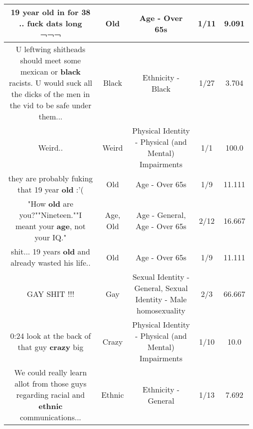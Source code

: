 \documentclass[11pt]{article}
\newlength\mylength
\begin{document}
\begin{center}
\begin{longtable}{|C{.65\mylength}|C{.30\mylength}|C{.12\mylength}|C{.12\mylength}|C{.12\mylength}|}
  \small 19 year \textbf{old} in for 38 .. fuck dats long ¬¬¬\normalsize   & Old & Age - Over 65s & 1/11 & 9.091 \\  \hline
  \small U leftwing shitheads should meet some mexican or \textbf{black} racists. U would suck all the dicks of the men in the vid to be safe under them...\normalsize   & Black & Ethnicity - Black & 1/27 & 3.704 \\  \hline
  \small Weird..\normalsize   & Weird & Physical Identity - Physical (and Mental) Impairments & 1/1 & 100.0 \\  \hline
  \small they are probably fuking that 19 year \textbf{old} :'(\normalsize   & Old & Age - Over 65s & 1/9 & 11.111 \\  \hline
  \small "How \textbf{old} are you?""Nineteen.""I meant your \textbf{age}, not your IQ."\normalsize   & Age, Old & Age - General, Age - Over 65s & 2/12 & 16.667 \\  \hline
  \small shit... 19 years \textbf{old} and already wasted his life..\normalsize   & Old & Age - Over 65s & 1/9 & 11.111 \\  \hline
  \small GAY SHIT !!!\normalsize   & Gay & Sexual Identity - General, Sexual Identity - Male homosexuality & 2/3 & 66.667 \\  \hline
  \small 0:24 look at the back of that guy \textbf{crazy} big\normalsize   & Crazy & Physical Identity - Physical (and Mental) Impairments & 1/10 & 10.0 \\  \hline
  \small We could really learn allot from those guys regarding racial and \textbf{ethnic} communications...\normalsize   & Ethnic & Ethnicity - General & 1/13 & 7.692 \\  \hline

\end{longtable}
\end{center}
\end{document}

